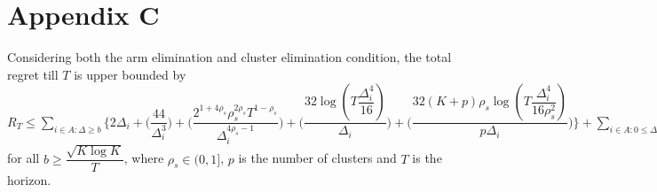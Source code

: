 \section{Appendix C}

\begin{theorem}
Considering both the arm elimination and cluster elimination condition, the total regret till $T$ is upper bounded by $R_{T}\leq \sum_{i\in A:\Delta\geq b} \bigg\lbrace 2\Delta_{i}+ \bigg(\dfrac{44}{\Delta_{i}^{3}}\bigg) + \bigg(\dfrac{2^{1+4\rho_{s}}\rho_{s}^{2\rho_{s}}T^{1-\rho_{s}}}{\Delta_{i}^{4\rho_{s}-1}}\bigg) + \bigg(\dfrac{32\log{(T\dfrac{\Delta_{i}^{4}}{16})}}{\Delta_{i}}\bigg) + \bigg(\dfrac{32(K+p)\rho_{s}\log{(T\dfrac{\Delta_{i}^{4}}{16\rho_{s}^{2}})}}{p\Delta_{i}}\bigg)\bigg\rbrace + \sum_{i\in A:0\leq\Delta_{i}\leq b}\bigg\lbrace \bigg(\dfrac{12}{b^{3}} \bigg) + \bigg(\dfrac{T^{1-\rho_{s}}\rho_{s}^{2\rho_{s}}2^{2\rho_{s}+\frac{3}{2}}}{\Delta_{i}^{4\rho_{s}-1}} \bigg)+\bigg(\dfrac{T^{1-\rho_{s}}\rho_{s}^{2\rho_{s}}2^{2\rho_{s}+\frac{3}{2}}}{b^{4\rho_{s} -1}} \bigg) \bigg\rbrace + max_{i:\Delta\leq b}\Delta_{i}T $ for all $b\geq \dfrac{\sqrt{K\log K}}{T}$, where $\rho_{s}\in (0,1]$, $p$ is the number of clusters and $T$ is the horizon.
\end{theorem}

